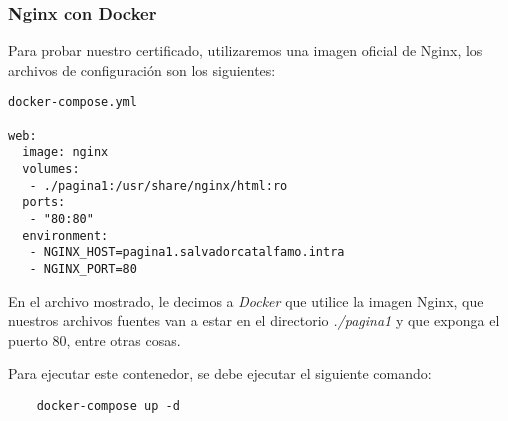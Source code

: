 \subsubsection*{Nginx con Docker}

Para probar nuestro certificado, utilizaremos una imagen oficial de Nginx, 
los archivos de configuración
son los siguientes:


\begin{verbatim}
docker-compose.yml

web:
  image: nginx
  volumes:
   - ./pagina1:/usr/share/nginx/html:ro
  ports:
   - "80:80"
  environment:
   - NGINX_HOST=pagina1.salvadorcatalfamo.intra
   - NGINX_PORT=80
\end{verbatim}

En el archivo mostrado, le decimos a \emph{Docker} que utilice la imagen Nginx, 
que nuestros archivos fuentes
van a estar en el directorio \textit{./pagina1} y que exponga el puerto 80, entre otras
 cosas.

\noindent Para ejecutar este contenedor, se debe ejecutar el siguiente comando:

\begin{verbatim}
    docker-compose up -d
\end{verbatim}


